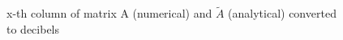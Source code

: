 \documentclass[a4paper, 16pt]{article}
\begin{document}
\begin{figure}[H]
\caption{x-th column of matrix A (numerical) and $\tilde{A}$ (analytical) converted to decibels}
\label{some example1}
\end{figure}
\end{document}
